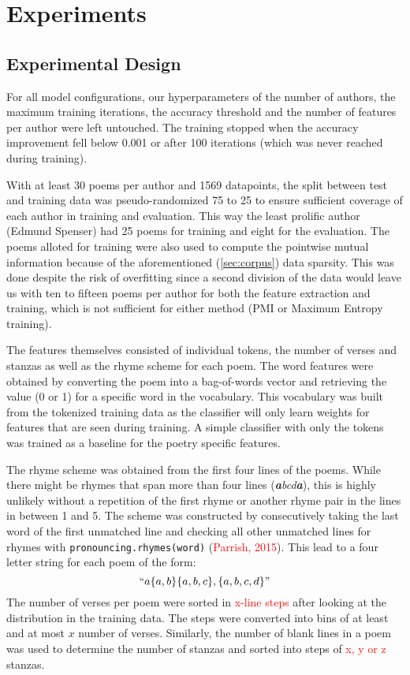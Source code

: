 \documentclass[11pt]{article}
\begin{document}
\section{Experiments}

\subsection{Experimental Design}

For all model configurations, our hyperparameters of the number of authors, the maximum training 
iterations, the accuracy threshold and the number of features per author were left untouched. The training stopped when the accuracy
improvement fell below  0.001 or after 100 iterations (which was never reached during training).

With at least 30 poems per author and 1569 datapoints, the split between test and training data was 
pseudo-randomized 75 to 25 to ensure sufficient coverage of each author in training and evaluation.
This way the least prolific author (Edmund Spenser) had 25 poems for training and eight for 
the evaluation. The poems alloted for training were also used to compute the pointwise mutual information
because of the aforementioned (\ref{sec:corpus}) data sparsity. This was done despite the risk of 
overfitting since a second division of the data would leave us with ten to fifteen poems per author 
for both the feature extraction and training, which is not sufficient for either method (PMI or Maximum
Entropy training).

The features themselves consisted of individual tokens, the number of verses and stanzas as well as the
rhyme scheme for each poem. The word features were obtained by converting the poem into a bag-of-words 
vector and retrieving the value (0 or 1) for a specific word in the vocabulary. This vocabulary was built
from the tokenized training data as the classifier will only learn weights for features that are seen during
training. A simple classifier with only the tokens was trained as a baseline for the poetry specific features.

The rhyme scheme was obtained from the first four lines of the poems. While there might be rhymes that span more
than four lines (\textit{\textbf{a}bcd\textbf{a}}), this is highly unlikely without a repetition of the first 
rhyme or another rhyme pair in the lines in between 1 and 5. The scheme was constructed by consecutively taking 
the last word of the first unmatched line and checking all other unmatched lines for rhymes with 
\texttt{pronouncing.rhymes(word)} (\textcolor{red}{Parrish, 2015}). This lead to a four letter string for each poem of the form:
\[``a\{a,b\}\{a,b,c\},\{a,b,c,d\}"\]
The number of verses per poem were sorted in \textcolor{red}{x-line steps} after looking at the distribution
in the training data. The steps were converted into bins of  at least and at most $x$ number of verses. 
Similarly, the number of blank lines in a poem was used to determine the number of stanzas and sorted 
into steps of \textcolor{red}{x, y or z} stanzas. 
\end{document}
